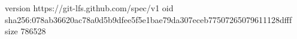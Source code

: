 version https://git-lfs.github.com/spec/v1
oid sha256:078ab36620ac78a0d5b9dfee5f5e1bae79da307eceb77507265079611128dfff
size 786528
